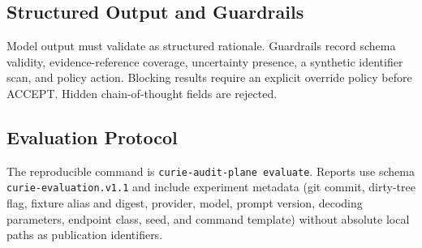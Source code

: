 \documentclass[journal]{IEEEtran}
\begin{document}
\subsection{Structured Output and Guardrails}
\label{sec:guardrails}

Model output must validate as structured rationale. Guardrails record schema
validity, evidence-reference coverage, uncertainty presence, a synthetic
identifier scan, and policy action. Blocking results require an explicit
override policy before ACCEPT. Hidden chain-of-thought fields are rejected.

\subsection{Evaluation Protocol}
\label{sec:eval}

The reproducible command is \texttt{curie-audit-plane evaluate}. Reports use
schema \texttt{curie-evaluation.v1.1} and include experiment metadata (git
commit, dirty-tree flag, fixture alias and digest, provider, model, prompt
version, decoding parameters, endpoint class, seed, and command template)
without absolute local paths as publication identifiers.
\end{document}
